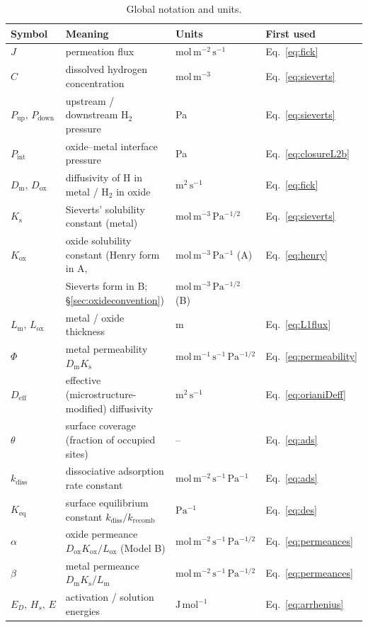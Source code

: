 \documentclass[11pt,a4paper]{article}
\newcommand{\Pup}{P_{\mathrm{up}}}
\newcommand{\Pdown}{P_{\mathrm{down}}}
\newcommand{\Pint}{P_{\mathrm{int}}}
\newcommand{\Ks}{K_{\mathrm{s}}}
\newcommand{\Kox}{K_{\mathrm{ox}}}
\newcommand{\Keq}{K_{\mathrm{eq}}}
\newcommand{\Dm}{D_{\mathrm{m}}}
\newcommand{\Dox}{D_{\mathrm{ox}}}
\newcommand{\Deff}{D_{\mathrm{eff}}}
\newcommand{\Lm}{L_{\mathrm{m}}}
\newcommand{\Lox}{L_{\mathrm{ox}}}
\newcommand{\kdiss}{k_{\mathrm{diss}}}
\newcommand{\krec}{k_{\mathrm{recomb}}}
\begin{document}
\begin{table}[h]
\centering
\caption{Global notation and units.}
\label{tab:notation}
\begin{tabular}{llll}
\toprule
Symbol & Meaning & Units & First used \\
\midrule
$J$ & permeation flux & $\mathrm{mol\,m^{-2}\,s^{-1}}$ & Eq.~\eqref{eq:fick} \\
$C$ & dissolved hydrogen concentration & $\mathrm{mol\,m^{-3}}$ & Eq.~\eqref{eq:sieverts} \\
$\Pup,\,\Pdown$ & upstream / downstream $\mathrm{H_2}$ pressure & Pa & Eq.~\eqref{eq:sieverts} \\
$\Pint$ & oxide--metal interface pressure & Pa & Eq.~\eqref{eq:closureL2b} \\
$\Dm,\,\Dox$ & diffusivity of H in metal / $\mathrm{H_2}$ in oxide & $\mathrm{m^2\,s^{-1}}$ & Eq.~\eqref{eq:fick} \\
$\Ks$ & Sieverts' solubility constant (metal) & $\mathrm{mol\,m^{-3}\,Pa^{-1/2}}$ & Eq.~\eqref{eq:sieverts} \\
$\Kox$ & oxide solubility constant (Henry form in A, & $\mathrm{mol\,m^{-3}\,Pa^{-1}}$ (A) & Eq.~\eqref{eq:henry} \\
 & \quad Sieverts form in B; \S\ref{sec:oxideconvention}) & $\mathrm{mol\,m^{-3}\,Pa^{-1/2}}$ (B) & \\
$\Lm,\,\Lox$ & metal / oxide thickness & m & Eq.~\eqref{eq:L1flux} \\
$\Phi$ & metal permeability $\Dm\Ks$ & $\mathrm{mol\,m^{-1}\,s^{-1}\,Pa^{-1/2}}$ & Eq.~\eqref{eq:permeability} \\
$\Deff$ & effective (microstructure-modified) diffusivity & $\mathrm{m^2\,s^{-1}}$ & Eq.~\eqref{eq:orianiDeff} \\
$\theta$ & surface coverage (fraction of occupied sites) & -- & Eq.~\eqref{eq:ads} \\
$\kdiss$ & dissociative adsorption rate constant & $\mathrm{mol\,m^{-2}\,s^{-1}\,Pa^{-1}}$ & Eq.~\eqref{eq:ads} \\
$\Keq$ & surface equilibrium constant $\kdiss/\krec$ & $\mathrm{Pa^{-1}}$ & Eq.~\eqref{eq:des} \\
$\alpha$ & oxide permeance $\Dox\Kox/\Lox$ (Model B) & $\mathrm{mol\,m^{-2}\,s^{-1}\,Pa^{-1/2}}$ & Eq.~\eqref{eq:permeances} \\
$\beta$ & metal permeance $\Dm\Ks/\Lm$ & $\mathrm{mol\,m^{-2}\,s^{-1}\,Pa^{-1/2}}$ & Eq.~\eqref{eq:permeances} \\
$E_D,\,H_s,\,E$ & activation / solution energies & $\mathrm{J\,mol^{-1}}$ & Eq.~\eqref{eq:arrhenius} \\
\bottomrule
\end{tabular}
\end{table}
\end{document}
